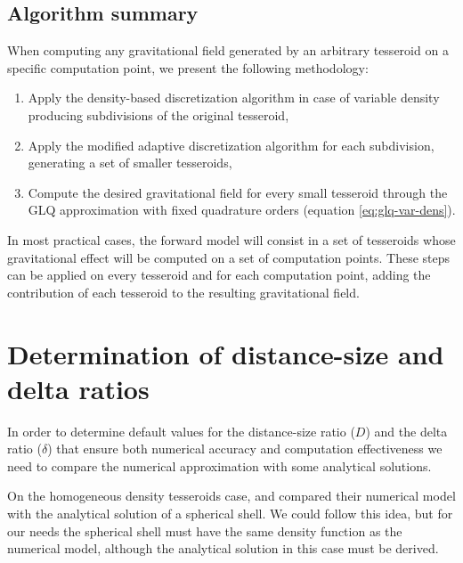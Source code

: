 \documentclass[extra]{gji}
\begin{document}
\subsection{Algorithm summary}

When computing any gravitational field generated by an arbitrary tesseroid on 
a specific computation point, we present the following methodology:

\begin{enumerate}
    \renewcommand{\theenumi}{(\arabic{enumi})}
    \item Apply the density-based discretization algorithm in case of 
          variable density producing subdivisions of the original tesseroid,
    \item Apply the modified adaptive discretization algorithm for 
          each subdivision, generating a set of smaller tesseroids,
    \item Compute the desired gravitational field for every small tesseroid 
          through the GLQ approximation with fixed quadrature orders
          (equation \ref{eq:glq-var-dens}).
\end{enumerate}

In most practical cases, the forward model will consist in a set of 
tesseroids whose gravitational effect will be computed on a set of 
computation points.
These steps can be applied on every tesseroid and for each computation point,
adding the contribution of each tesseroid to the resulting 
gravitational field.



\section{Determination of distance-size and delta ratios}

In order to determine default values for the distance-size ratio ($D$)
and the delta ratio ($\delta$) that ensure both numerical accuracy and 
computation effectiveness we need to compare the numerical 
approximation with some analytical solutions.

On the homogeneous density tesseroids case, \citet{Uieda2016} and 
\citet{Grombein2013} compared their numerical model with the analytical 
solution of a spherical shell.
We could follow this idea, but for our needs the spherical shell must 
have the same density function as the numerical model, although the 
analytical solution in this case must be derived.
\end{document}
